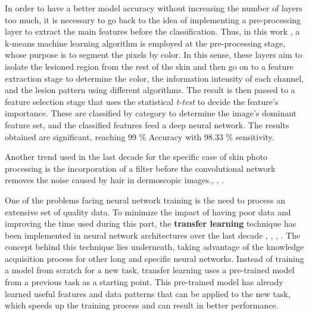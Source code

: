In order to have a better model accuracy without increasing the number of layers too much,  it is necessary to go back to the idea of implementing a pre-processing layer to extract the main features before the classification. Thus, in this work \cite{thamizhamuthu_deep_2023}, a k-means machine learning algorithm is employed at the pre-processing stage, whose purpose is to segment the pixels by color. In this sense, these layers aim to isolate the lesioned region from the rest of the skin and then go on to a feature extraction stage to determine the color, the information intensity of each channel, and the lesion pattern using different algorithms. The result is then passed to a feature selection stage that uses the statistical \textit{t-test} to decide the feature's importance. These are classified by category to determine the image's dominant feature set, and the classified features feed a deep neural network. The results obtained are significant, reaching 99 \% Accuracy with 98.33 \% sensitivity. 

Another trend used in the last decade for the specific case of skin photo processing is the incorporation of a filter before the convolutional network removes the noise caused by hair in dermoscopic images.\cite{talavera-martinez_hair_2021}, \cite{bardou_hair_2022}, \cite{kaur_hairlines_2022}.

One of the problems facing neural network training is the need to process an extensive set of quality data. To minimize the impact of having poor data and improving the time used during this part, the \textbf{transfer learning} technique has been implemented in neural network architectures over the last decade \cite{rodrigues_new_2020}, \cite{wall_deep_2020}, \cite{abbes_deep_2021}, \cite{georgakopoulos_detection_2017}. The concept behind this technique lies underneath, taking advantage of the knowledge acquisition process for other long and specific neural networks. Instead of training a model from scratch for a new task, transfer learning uses a pre-trained model from a previous task as a starting point. This pre-trained model has already learned useful features and data patterns that can be applied to the new task, which speeds up the training process and can result in better performance. 

